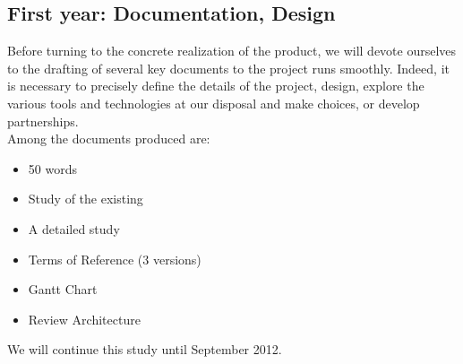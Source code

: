 \documentclass {life-en}
\begin{document}
\subsection{First year: Documentation, Design}

Before turning to the concrete realization of the product, we will devote ourselves to the drafting of several key documents to the project runs smoothly. Indeed, it is necessary to precisely define the details of the project, design, explore the various tools and technologies at our disposal and make choices, or develop partnerships.\\
Among the documents produced are:

\begin{itemize}
  \item 50 words
  \item Study of the existing
  \item A detailed study
  \item Terms of Reference (3 versions)
  \item Gantt Chart
  \item Review Architecture
\end{itemize}

We will continue this study until September 2012.\\

\newpage
\end{document}
